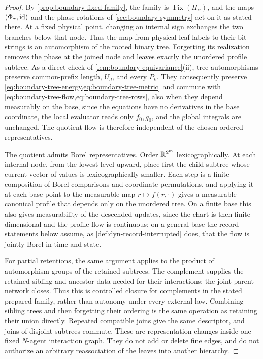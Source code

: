 \begin{proof}
By \cref{prop:boundary-fixed-family}, the family is $\operatorname{Fix}(H_\alpha)$, and the maps $(\Phi_\tau,\mathrm{id})$ and the phase rotations of \cref{sec:boundary-symmetry} act on it as stated there. At a fixed physical point, changing an internal sign exchanges the two branches below that node. Thus the map from physical leaf labels to their bit strings is an automorphism of the rooted binary tree. Forgetting its realization removes the phase at the joined node and leaves exactly the unordered profile subtree. As a direct check of \cref{lem:boundary-equivariance}(ii), tree automorphisms preserve common-prefix length, $U_d$, and every $P_k$. They consequently preserve \cref{eq:boundary-tree-energy,eq:boundary-tree-metric} and commute with \cref{eq:boundary-tree-flow,eq:boundary-tree-rows}, also when they depend measurably on the base, since the equations have no derivatives in the base coordinate, the local evaluator reads only $f_0,g_0$, and the global integrals are unchanged. The quotient flow is therefore independent of the chosen ordered representatives.

The quotient admits Borel representatives. Order $\mathbb R^{2^m}$ lexicographically. At each internal node, from the lowest level upward, place first the child subtree whose current vector of values is lexicographically smaller. Each step is a finite composition of Borel comparisons and coordinate permutations, and applying it at each base point to the measurable map $r\mapsto f(r,\cdot)$ gives a measurable canonical profile that depends only on the unordered tree. On a finite base this also gives measurability of the descended updates, since the chart is then finite dimensional and the profile flow is continuous; on a general base the record statements below assume, as \cref{def:dyn-record-interrupted} does, that the flow is jointly Borel in time and state.

For partial retentions, the same argument applies to the product of automorphism groups of the retained subtrees. The complement supplies the retained sibling and ancestor data needed for their interactions; the joint parent network closes. Thus this is controlled closure for complements in the stated prepared family, rather than autonomy under every external law. Combining sibling trees and then forgetting their ordering is the same operation as retaining their union directly. Repeated compatible joins give the same descriptor, and joins of disjoint subtrees commute. These are representation changes inside one fixed $N$-agent interaction graph. They do not add or delete fine edges, and do not authorize an arbitrary reassociation of the leaves into another hierarchy.


\end{proof}

